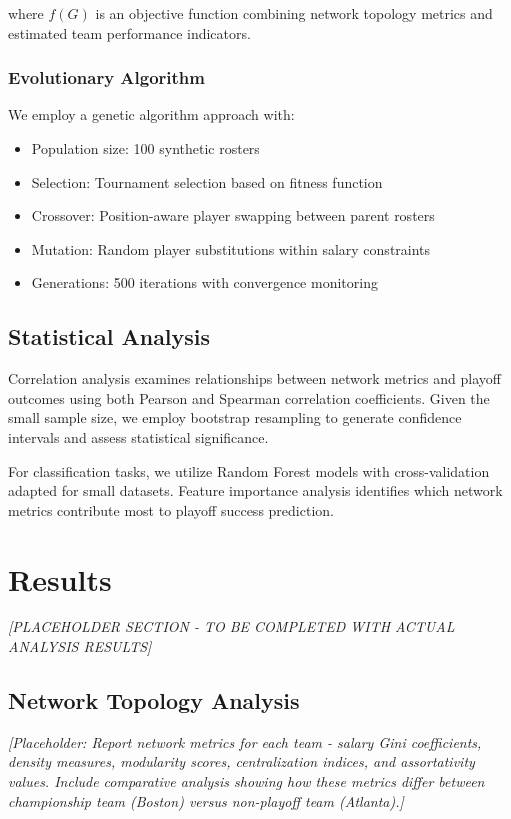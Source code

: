 \documentclass[11pt]{article}
\begin{document}
where $f(G)$ is an objective function combining network topology metrics and estimated team performance indicators.

\subsubsection{Evolutionary Algorithm}

We employ a genetic algorithm approach with:
\begin{itemize}
    \item Population size: 100 synthetic rosters
    \item Selection: Tournament selection based on fitness function
    \item Crossover: Position-aware player swapping between parent rosters
    \item Mutation: Random player substitutions within salary constraints
    \item Generations: 500 iterations with convergence monitoring
\end{itemize}

\subsection{Statistical Analysis}

Correlation analysis examines relationships between network metrics and playoff outcomes using both Pearson and Spearman correlation coefficients. Given the small sample size, we employ bootstrap resampling to generate confidence intervals and assess statistical significance.

For classification tasks, we utilize Random Forest models with cross-validation adapted for small datasets. Feature importance analysis identifies which network metrics contribute most to playoff success prediction.

\section{Results}

\textit{[PLACEHOLDER SECTION - TO BE COMPLETED WITH ACTUAL ANALYSIS RESULTS]}

\subsection{Network Topology Analysis}

\textit{[Placeholder: Report network metrics for each team - salary Gini coefficients, density measures, modularity scores, centralization indices, and assortativity values. Include comparative analysis showing how these metrics differ between championship team (Boston) versus non-playoff team (Atlanta).]}
\end{document}
